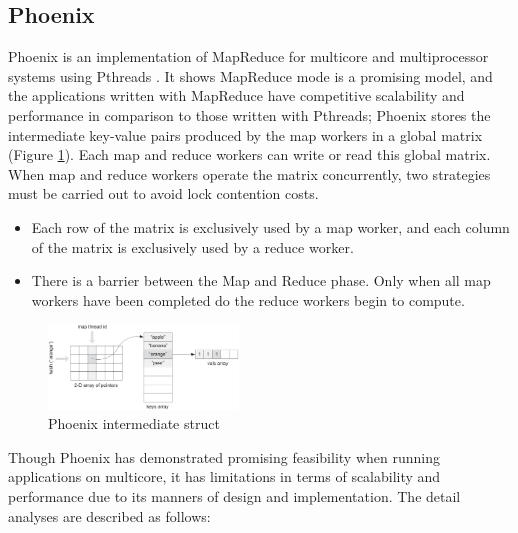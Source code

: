\subsection{Phoenix}
Phoenix is an implementation of MapReduce for multicore  and multiprocessor systems using Pthreads \cite{}.
It shows MapReduce mode is a promising model,  and the applications written with MapReduce have competitive scalability and performance in comparison to those written with Pthreads\cite{ranger2007phoenix};
Phoenix stores the intermediate key-value pairs produced 
by the map workers in a global matrix (Figure \ref{fig:phoenix:intermediate}). 
Each map and reduce workers can write or read this global matrix. 
When map and reduce workers operate the matrix concurrently,
two strategies must be carried out to avoid lock contention costs.
\begin{itemize}
	\item Each row of the matrix is exclusively used by a map worker, and each column of the matrix is exclusively used by a reduce worker. 
	\item There is a barrier between the Map and Reduce phase. Only when all map workers have been completed do the reduce workers begin to compute. 
\end{itemize}

\begin{figure}[!h!t]  
    \centering
    \includegraphics[width=0.45\textwidth]{eps/phoenix_intermediate.eps}
    \caption{Phoenix intermediate struct}
    \label{fig:phoenix:intermediate}
\end{figure}

Though Phoenix has demonstrated promising feasibility when running  applications on multicore, it has limitations in terms of scalability and performance due to its manners of design and implementation.
The detail analyses are described as follows:

